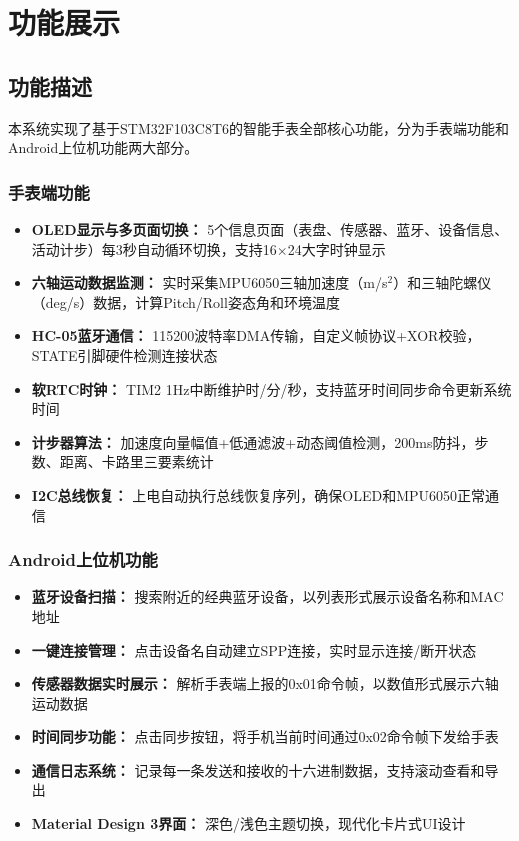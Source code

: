 
\section{功能展示}

\subsection{功能描述}
本系统实现了基于STM32F103C8T6的智能手表全部核心功能，分为手表端功能和Android上位机功能两大部分。

\subsubsection{手表端功能}
\begin{itemize}
    \item \textbf{OLED显示与多页面切换：} 5个信息页面（表盘、传感器、蓝牙、设备信息、活动计步）每3秒自动循环切换，支持16$\times$24大字时钟显示
    \item \textbf{六轴运动数据监测：} 实时采集MPU6050三轴加速度（m/s$^2$）和三轴陀螺仪（deg/s）数据，计算Pitch/Roll姿态角和环境温度
    \item \textbf{HC-05蓝牙通信：} 115200波特率DMA传输，自定义帧协议+XOR校验，STATE引脚硬件检测连接状态
    \item \textbf{软RTC时钟：} TIM2 1Hz中断维护时/分/秒，支持蓝牙时间同步命令更新系统时间
    \item \textbf{计步器算法：} 加速度向量幅值+低通滤波+动态阈值检测，200ms防抖，步数、距离、卡路里三要素统计
    \item \textbf{I2C总线恢复：} 上电自动执行总线恢复序列，确保OLED和MPU6050正常通信
\end{itemize}

\subsubsection{Android上位机功能}
\begin{itemize}
    \item \textbf{蓝牙设备扫描：} 搜索附近的经典蓝牙设备，以列表形式展示设备名称和MAC地址
    \item \textbf{一键连接管理：} 点击设备名自动建立SPP连接，实时显示连接/断开状态
    \item \textbf{传感器数据实时展示：} 解析手表端上报的0x01命令帧，以数值形式展示六轴运动数据
    \item \textbf{时间同步功能：} 点击同步按钮，将手机当前时间通过0x02命令帧下发给手表
    \item \textbf{通信日志系统：} 记录每一条发送和接收的十六进制数据，支持滚动查看和导出
    \item \textbf{Material Design 3界面：} 深色/浅色主题切换，现代化卡片式UI设计
\end{itemize}

